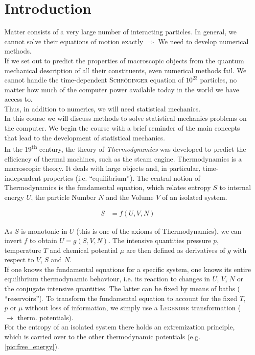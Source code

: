 \chapter{Introduction}

Matter consists of a very large number of interacting particles. In general, we cannot solve their equations of motion exactly $\Rightarrow$ We need to develop numerical methods.\\
If we set out to predict the properties of macroscopic objects from the quantum mechanical description of all their constituents, even numerical methods fail. We cannot handle the time-dependent \textsc{Schrödinger} equation of $10^{23}$ particles, no matter how much of the computer power available today in the world we have access to.\\
Thus, in addition to numerics, we will need statistical mechanics.\\
In this course we will discuss methods to solve statistical mechanics problems on the computer. We begin the course with a brief reminder of the main concepts that lead to the development of statistical mechanics.\\

In the 19\textsuperscript{th} century, the theory of \emph{Thermodynamics} was developed to predict the efficiency of thermal machines, such as the steam engine. Thermodynamics is a macroscopic theory. It deals with large objects and, in particular, time-independent properties (i.e. ``equilibrium''). The central notion of Thermodynamics is the fundamental equation, which relates entropy $S$ to internal energy $U$, the particle Number $N$ and the Volume $V$ of an isolated system.

\begin{align}
S &= f(U, V, N)
\end{align}

As $S$ is monotonic in $U$ (this is one of the axioms of Thermodynamics), we can invert $f$ to obtain $U = g(S, V, N)$. The intensive quantities pressure $p$, temperature $T$ and chemical potential $\mu$ are then defined as derivatives of $g$ with respect to $V$, $S$ and $N$.\\
If one knows the fundamental equations for a specific system, one knows its entire equilibrium thermodynamic behaviour, i.e. its reaction to changes in $U$, $V$, $N$ or the conjugate intensive quantities. The latter can be fixed by means of baths ( ``reservoirs''). To transform the fundamental equation to account for the fixed $T$, $p$ or $\mu$ without loss of information, we simply use a \textsc{Legendre} transformation ($\rightarrow$ therm. potentials).\\
For the entropy of an isolated system there holds an extremization principle, which is carried over to the other thermodynamic potentials (e.g. \cref{pic:free_energy}).\\

